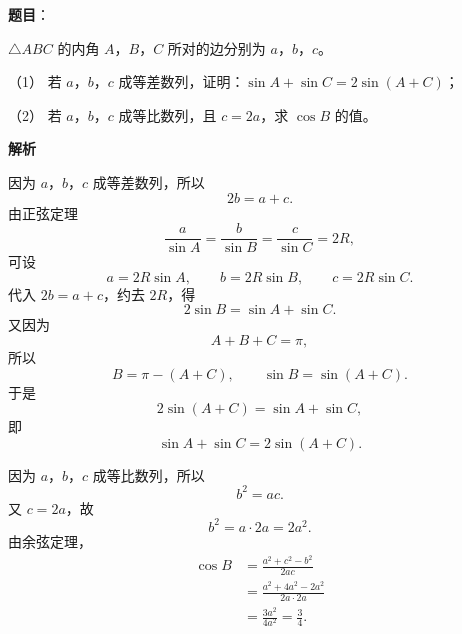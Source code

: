 \begin{answer}

\end{answer}
\begin{answer}

\textbf{题目}：

$\triangle ABC$ 的内角 $A$，$B$，$C$ 所对的边分别为 $a$，$b$，$c$。

（1） 若 $a$，$b$，$c$ 成等差数列，证明：$\sin A+\sin C=2\sin(A+C)$；

（2） 若 $a$，$b$，$c$ 成等比数列，且 $c=2a$，求 $\cos B$ 的值。

\textbf{解析}


因为 $a$，$b$，$c$ 成等差数列，所以
\nopagebreak[4]
\[2b=a+c.\]
由正弦定理
\nopagebreak[4]
\[\frac a{\sin A}=\frac b{\sin B}=\frac c{\sin C}=2R,\]
可设
\nopagebreak[4]
\[a=2R\sin A,\qquad b=2R\sin B,\qquad c=2R\sin C.\]
代入 $2b=a+c$，约去 $2R$，得
\nopagebreak[4]
\[2\sin B=\sin A+\sin C.\]
又因为
\nopagebreak[4]
\[A+B+C=\pi,\]
所以
\nopagebreak[4]
\[B=\pi-(A+C),\qquad \sin B=\sin(A+C).\]
于是
\nopagebreak[4]
\[2\sin(A+C)=\sin A+\sin C,\]
即
\nopagebreak[4]
\[\sin A+\sin C=2\sin(A+C).\]


因为 $a$，$b$，$c$ 成等比数列，所以
\nopagebreak[4]
\[b^2=ac.\]
又 $c=2a$，故
\nopagebreak[4]
\[b^2=a\cdot2a=2a^2.\]
由余弦定理，
\nopagebreak[4]
\[\begin{aligned}
\cos B&=\frac{a^2+c^2-b^2}{2ac}\\
&=\frac{a^2+4a^2-2a^2}{2a\cdot2a}\\
&=\frac{3a^2}{4a^2}=\frac34.
\end{aligned}\]



\end{answer}
